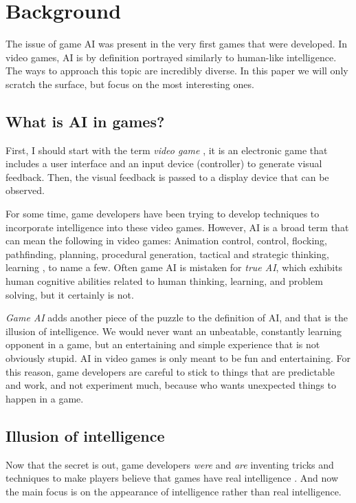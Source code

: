 \documentclass[a4paper,12pt,openright]{book}
\begin{document}
\chapter{Background}
\label{ch1}
The issue of game AI \cite{AIwiki} was present in the very first games that were developed. In video games, AI is by definition portrayed similarly to human-like intelligence. The ways to approach this topic are incredibly diverse. In this paper we will only scratch the surface, but focus on the most interesting ones.

\section{What is AI in games?}
First, I should start with the term \emph{video game} \cite{VideoGameWiki}, it is an electronic game that includes a user interface and an input device (controller) to generate visual feedback. Then, the visual feedback is passed to a display device that can be observed. 

For some time, game developers have been trying to develop techniques to incorporate intelligence into these video games. However, AI is a broad term that can mean the following in video games: Animation control, control, flocking, pathfinding, planning, procedural generation, tactical and strategic thinking, learning \cite{FuzzyAIGames}, to name a few. Often game AI is mistaken for \emph{true AI}, which exhibits human cognitive abilities related to human thinking, learning, and problem solving, but it certainly is not.

\emph{Game AI} adds another piece of the puzzle to the definition of AI, and that is the illusion of intelligence. We would never want an unbeatable, constantly learning opponent in a game, but an entertaining and simple experience that is not obviously stupid. AI in video games is only meant to be fun and entertaining. For this reason, game developers are careful to stick to things that are predictable and work, and not experiment much, because who wants unexpected things to happen in a game.

\section{Illusion of intelligence}
Now that the secret is out, game developers \emph{were} and \emph{are} inventing tricks and techniques to make players believe that games have real intelligence \cite{IllusionOfIntelligece}. And now the main focus is on the appearance of intelligence rather than real intelligence.
\end{document}
